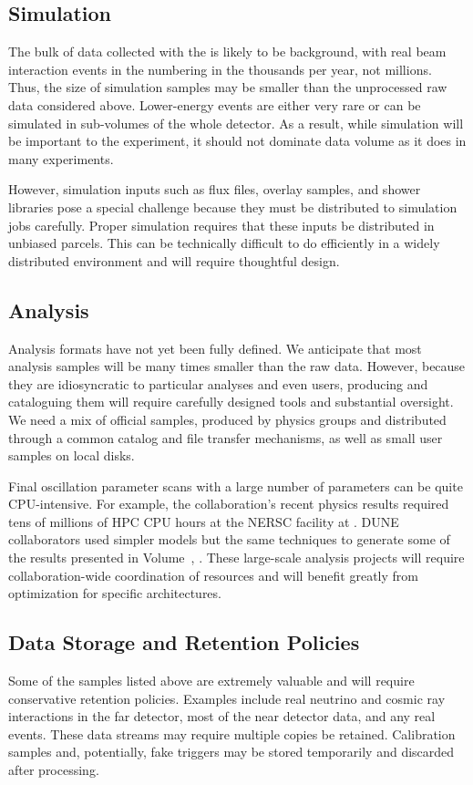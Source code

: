 \subsection{Simulation}
The bulk of data collected with the  is likely to be background, with real beam interaction events in the  numbering in the thousands per year, not millions. Thus, the size of simulation samples may be %
smaller than the unprocessed raw data considered above.  Lower-energy events are either very rare or can be simulated in sub-volumes of the whole detector.  As a result, while simulation will be important to the experiment, it should not dominate data volume as it does in many experiments.  

However, simulation inputs such as flux files, overlay samples, and shower libraries pose a special challenge because they must be distributed to simulation jobs carefully.   Proper simulation requires that these inputs be distributed in unbiased parcels.  This can be technically difficult to do efficiently in a widely distributed environment and will require thoughtful design. 

\subsection{Analysis}

Analysis formats have not yet been fully defined.  We anticipate that most analysis samples will be many times smaller than the raw data.  However, because they are idiosyncratic to particular analyses and even users,  producing and cataloguing them will require carefully designed tools and substantial oversight. 
We need a mix of official samples, produced by physics groups and distributed through a common catalog and file transfer mechanisms, as well as small user samples on local disks. 

Final oscillation parameter scans with a large number of %
parameters can be quite CPU-intensive.  For example, the  collaboration's recent physics results required tens of millions of  HPC CPU hours at the NERSC facility at . DUNE collaborators used simpler models but the same techniques to generate some of the results presented in Volume~\volnumberphysics{}, \voltitlephysics{}. These large-scale analysis projects will require collaboration-wide coordination of resources and will benefit greatly from optimization for specific architectures.

\subsection{Data Storage and Retention Policies}
Some of the samples listed above are extremely valuable and will require conservative retention policies.   Examples include real neutrino and cosmic ray interactions in the far detector, most of the near detector data, and any real  events.  These data streams may require multiple copies be retained. Calibration samples and, potentially, fake  triggers may be stored temporarily and discarded after processing. 



